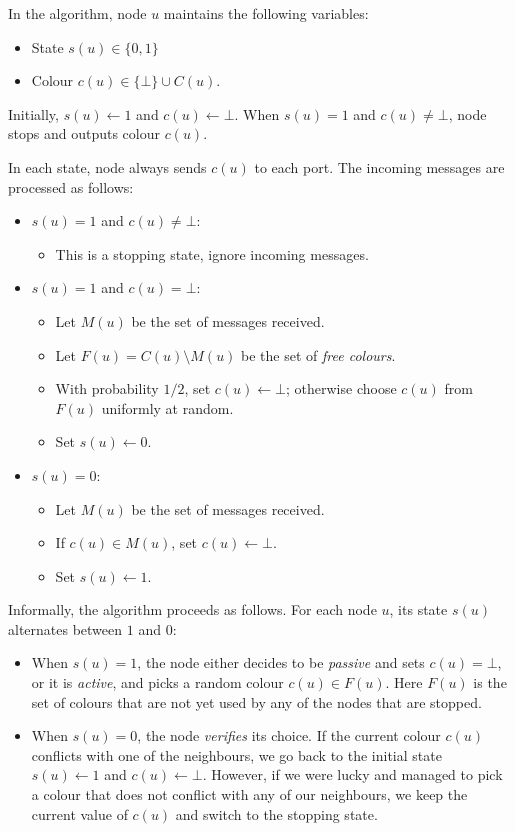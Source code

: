 In the algorithm, node $u$ maintains the following variables:
\begin{itemize}[noitemsep]
    \item State $s(u) \in \{0,1\}$
    \item Colour $c(u) \in \{\bot\} \cup C(u)$.
\end{itemize}
Initially, $s(u) \gets 1$ and $c(u) \gets \bot$. When $s(u) = 1$ and $c(u) \ne \bot$, node stops and outputs colour $c(u)$.

In each state, node always sends $c(u)$ to each port. The incoming messages are processed as follows:
\begin{itemize}
    \item $s(u) = 1$ and $c(u) \ne \bot$:
    \begin{itemize}
        \item This is a stopping state, ignore incoming messages.
    \end{itemize}
    \item $s(u) = 1$ and $c(u) = \bot$:
    \begin{itemize}
        \item Let $M(u)$ be the set of messages received.
        \item Let $F(u) = C(u) \setminus M(u)$ be the set of \emph{free colours}.
        \item With probability $1/2$, set $c(u) \gets \bot$; otherwise choose $c(u)$ from $F(u)$ uniformly at random.
        \item Set $s(u) \gets 0$.
    \end{itemize}
    \item $s(u) = 0$:
    \begin{itemize}
        \item Let $M(u)$ be the set of messages received.
        \item If $c(u) \in M(u)$, set $c(u) \gets \bot$.
        \item Set $s(u) \gets 1$.
    \end{itemize}
\end{itemize}

Informally, the algorithm proceeds as follows. For each node $u$, its state $s(u)$ alternates between $1$ and $0$:
\begin{itemize}
    \item When $s(u) = 1$, the node either decides to be \emph{passive} and sets $c(u) = \bot$, or it is \emph{active}, and picks a random colour $c(u) \in F(u)$. Here $F(u)$ is the set of colours that are not yet used by any of the nodes that are stopped.
    \item When $s(u) = 0$, the node \emph{verifies} its choice. If the current colour $c(u)$ conflicts with one of the neighbours, we go back to the initial state $s(u) \gets 1$ and $c(u) \gets \bot$. However, if we were lucky and managed to pick a colour that does not conflict with any of our neighbours, we keep the current value of $c(u)$ and switch to the stopping state.
\end{itemize}


